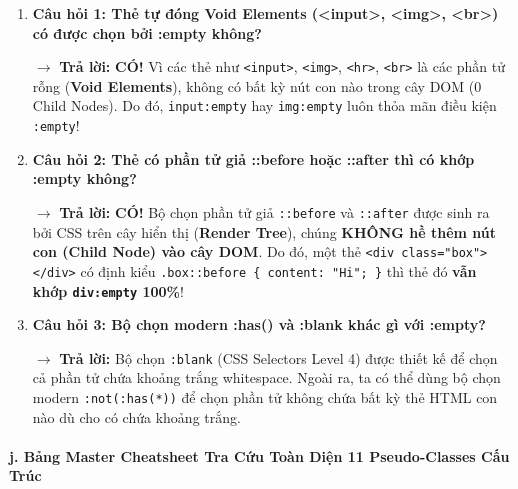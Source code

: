 \documentclass[11pt,oneside]{book}
\newcommand{\codeinline}[1]{\textcolor{accentOrange}{\texttt{#1}}}
\newcommand{\term}[1]{\textbf{\textcolor{primaryBlue}{#1}}}
\begin{document}
\begin{warnBox}
\begin{enumerate}[leftmargin=1.5em, itemsep=5pt, parsep=0pt]
    \item \textbf{Câu hỏi 1: Thẻ tự đóng Void Elements (<input>, <img>, <br>) có được chọn bởi :empty không?} \par
    $\rightarrow$ \textbf{Trả lời:} \textbf{CÓ!} Vì các thẻ như \codeinline{<input>}, \codeinline{<img>}, \codeinline{<hr>}, \codeinline{<br>} là các phần tử rỗng (\term{Void Elements}), không có bất kỳ nút con nào trong cây DOM (0 Child Nodes). Do đó, \codeinline{input:empty} hay \codeinline{img:empty} luôn thỏa mãn điều kiện \codeinline{:empty}!

    \item \textbf{Câu hỏi 2: Thẻ có phần tử giả ::before hoặc ::after thì có khớp :empty không?} \par
    $\rightarrow$ \textbf{Trả lời:} \textbf{CÓ!} Bộ chọn phần tử giả \codeinline{::before} và \codeinline{::after} được sinh ra bởi CSS trên cây hiển thị (\term{Render Tree}), chúng \textbf{KHÔNG hề thêm nút con (\term{Child Node}) vào cây DOM}. Do đó, một thẻ \codeinline{<div class="box"></div>} có định kiểu \codeinline{.box::before \{ content: "Hi"; \}} thì thẻ đó \textbf{vẫn khớp \codeinline{div:empty} 100\%}!

    \item \textbf{Câu hỏi 3: Bộ chọn modern :has() và :blank khác gì với :empty?} \par
    $\rightarrow$ \textbf{Trả lời:} Bộ chọn \codeinline{:blank} (CSS Selectors Level 4) được thiết kế để chọn cả phần tử chứa khoảng trắng whitespace. Ngoài ra, ta có thể dùng bộ chọn modern \codeinline{:not(:has(*))} để chọn phần tử không chứa bất kỳ thẻ HTML con nào dù cho có chứa khoảng trắng.
\end{enumerate}
\end{warnBox}

\paragraph{j. Bảng Master Cheatsheet Tra Cứu Toàn Diện 11 Pseudo-Classes Cấu Trúc}
\end{document}
